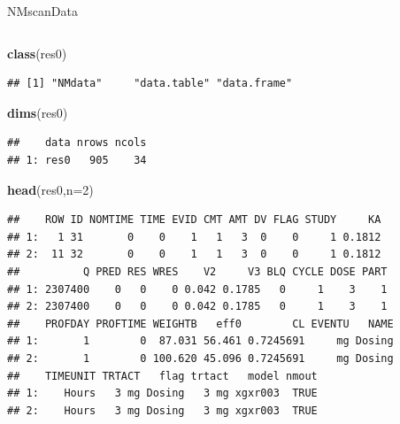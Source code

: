 \documentclass[
  8pt,
  ignorenonframetext,
  aspectratio=169]{beamer}
\newenvironment{Shaded}{\begin{snugshade}}{\end{snugshade}}
\newcommand{\DataTypeTok}[1]{\textcolor[rgb]{0.13,0.29,0.53}{#1}}
\newcommand{\DecValTok}[1]{\textcolor[rgb]{0.00,0.00,0.81}{#1}}
\newcommand{\KeywordTok}[1]{\textcolor[rgb]{0.13,0.29,0.53}{\textbf{#1}}}
\newcommand{\NormalTok}[1]{#1}
\begin{document}
\begin{frame}[fragile]{NMscanData}
\begin{columns}[T]
\pause

\begin{column}{0.48\textwidth}
\begin{Shaded}
\begin{Highlighting}[]
\KeywordTok{class}\NormalTok{(res0)}
\end{Highlighting}
\end{Shaded}

\begin{verbatim}
## [1] "NMdata"     "data.table" "data.frame"
\end{verbatim}

\begin{Shaded}
\begin{Highlighting}[]
\KeywordTok{dims}\NormalTok{(res0)}
\end{Highlighting}
\end{Shaded}

\begin{verbatim}
##    data nrows ncols
## 1: res0   905    34
\end{verbatim}

\begin{Shaded}
\begin{Highlighting}[]
\KeywordTok{head}\NormalTok{(res0,}\DataTypeTok{n=}\DecValTok{2}\NormalTok{)}
\end{Highlighting}
\end{Shaded}

\begin{verbatim}
##    ROW ID NOMTIME TIME EVID CMT AMT DV FLAG STUDY     KA
## 1:   1 31       0    0    1   1   3  0    0     1 0.1812
## 2:  11 32       0    0    1   1   3  0    0     1 0.1812
##          Q PRED RES WRES    V2     V3 BLQ CYCLE DOSE PART
## 1: 2307400    0   0    0 0.042 0.1785   0     1    3    1
## 2: 2307400    0   0    0 0.042 0.1785   0     1    3    1
##    PROFDAY PROFTIME WEIGHTB   eff0        CL EVENTU   NAME
## 1:       1        0  87.031 56.461 0.7245691     mg Dosing
## 2:       1        0 100.620 45.096 0.7245691     mg Dosing
##    TIMEUNIT TRTACT   flag trtact   model nmout
## 1:    Hours   3 mg Dosing   3 mg xgxr003  TRUE
## 2:    Hours   3 mg Dosing   3 mg xgxr003  TRUE
\end{verbatim}

\normalsize
\end{column}
\end{columns}
\end{frame}
\end{document}
